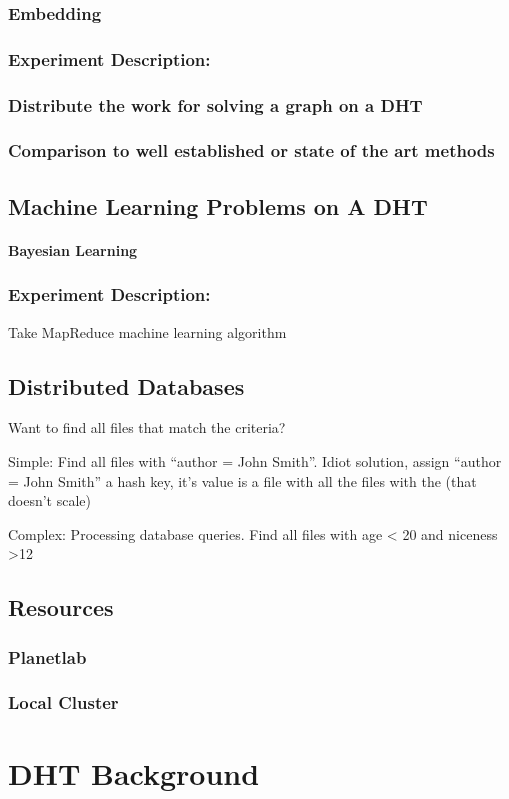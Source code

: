 \documentclass[10pt,letterpaper]{report}
\begin{document}
\subsection{Embedding}

\subsection{Experiment Description:}
\subsection{Distribute the work for solving a graph on a DHT}
\subsection{Comparison to well established or state of the art methods}



\section{Machine Learning Problems on A DHT}


\subsubsection{Bayesian Learning}
\subsection{Experiment Description:}
Take MapReduce machine learning algorithm

\section{Distributed Databases}


Want to find all files that match the criteria?

Simple: Find all files with ``author = John Smith''.  Idiot solution, assign ``author = John Smith'' a hash key,  it's value is a file with all the files with the (that doesn't scale) 


Complex: Processing database queries.   Find all files with age < 20 and niceness >12


\section{Resources}
\subsection{Planetlab}
\subsection{Local Cluster}

\chapter{DHT Background}





\end{document}
